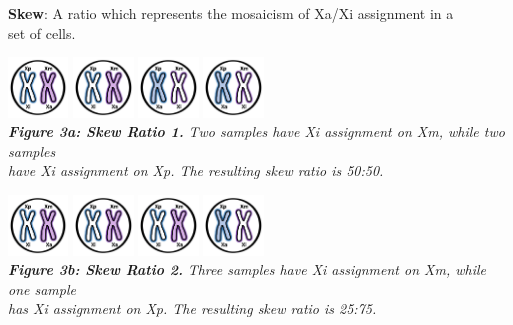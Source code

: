 \documentclass[
]{article}
\begin{document}
\textbf{Skew}: A ratio which represents the mosaicism of Xa/Xi
assignment in a\\
set of cells.

\includegraphics[width=0.12\textwidth,height=\textheight]{images/XCI-images/Slide5.png}
\includegraphics[width=0.12\textwidth,height=\textheight]{images/XCI-images/Slide5.png}
\includegraphics[width=0.12\textwidth,height=\textheight]{images/XCI-images/Slide6.png}
\includegraphics[width=0.12\textwidth,height=\textheight]{images/XCI-images/Slide6.png}\\
\textbf{\emph{Figure 3a: Skew Ratio 1.}} \emph{Two samples have Xi
assignment on Xm, while two samples}\\
\emph{have Xi assignment on Xp. The resulting skew ratio is 50:50.}

\includegraphics[width=0.12\textwidth,height=\textheight]{images/XCI-images/Slide5.png}
\includegraphics[width=0.12\textwidth,height=\textheight]{images/XCI-images/Slide5.png}
\includegraphics[width=0.12\textwidth,height=\textheight]{images/XCI-images/Slide5.png}
\includegraphics[width=0.12\textwidth,height=\textheight]{images/XCI-images/Slide6.png}\\
\textbf{\emph{Figure 3b: Skew Ratio 2.}} \emph{Three samples have Xi
assignment on Xm, while one sample}\\
\emph{has Xi assignment on Xp. The resulting skew ratio is 25:75.}
\end{document}
